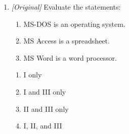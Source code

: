 \begin{enumerate}[label=\textbf{Q\arabic*.}, leftmargin=*]
\begin{enumerate}[label=\Alph*.]
    \item named range
  \end{enumerate}
\item \textit{[Original]} Evaluate the statements:
  \begin{enumerate}[label=\Roman*.]
    \item MS-DOS is an operating system.
    \item MS Access is a spreadsheet.
    \item MS Word is a word processor.
  \end{enumerate}
  \begin{enumerate}[label=\Alph*.]
    \item I only
    \item I and III only
    \item II and III only
    \item I, II, and III
  \end{enumerate}


\end{enumerate}
